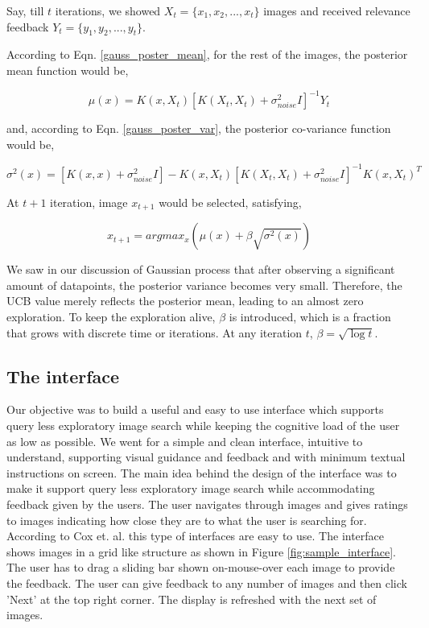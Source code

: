 \documentclass[english]{tktltiki}
\begin{document}
Say, till $t$ iterations, we showed $X_t = \{x_1, x_2, ..., x_t\}$ images and received relevance feedback $Y_t = \{y_1, y_2, ..., y_t\}$.

According to Eqn. \ref{gauss_poster_mean}, for the rest of the images, the posterior mean function would be,

\begin{equation}
\mu(x) = K(x, X_t)[K(X_t, X_t) + \sigma_{noise}^2I]^{-1}Y_t
\end{equation}

and, according to Eqn. \ref{gauss_poster_var}, the posterior co-variance function would be,

\begin{equation}
\sigma^2(x) = [K(x, x) + \sigma_{noise}^2I] - K(x, X_t)[K(X_t, X_t) + \sigma_{noise}^2I]^{-1}K(x, X_t)^T
\end{equation}

At $t+1$ iteration, image $x_{t+1}$ would be selected, satisfying,

\begin{equation}
x_{t+1} = argmax_x(\mu(x) + \beta\sqrt{\sigma^2(x)})
\end{equation}

We saw in our discussion of Gaussian process that after observing a significant amount of datapoints, the posterior variance becomes very small. Therefore, the UCB value merely reflects the posterior mean, leading to an almost zero exploration. To keep the exploration alive, $\beta$ is introduced, which is a fraction that grows with discrete time or iterations. At any iteration $t$, $\beta = \sqrt{\log t}$.

\subsection{The interface}

Our objective was to build a useful and easy to use interface which supports query less exploratory image search \cite{pichunter, PicSOM, iter_rel_feed} while keeping the cognitive load of the user as low as possible. We went for a simple and clean interface, intuitive to understand, supporting visual guidance and feedback and with minimum textual instructions on screen. The main idea behind the design of the interface was to make it support query less exploratory image search while accommodating feedback given by the users. The user navigates through images and gives ratings to images indicating how close they are to what the user is searching for. According to Cox et. al. \cite{pichunter} this type of interfaces are easy to use. The interface shows images in a grid like structure as shown in Figure \ref{fig:sample_interface}. The user has to drag a sliding bar shown on-mouse-over each image to provide the feedback. The user can give feedback to any number of images and then click 'Next' at the top right corner. The display is refreshed with the next set of images.
\end{document}
